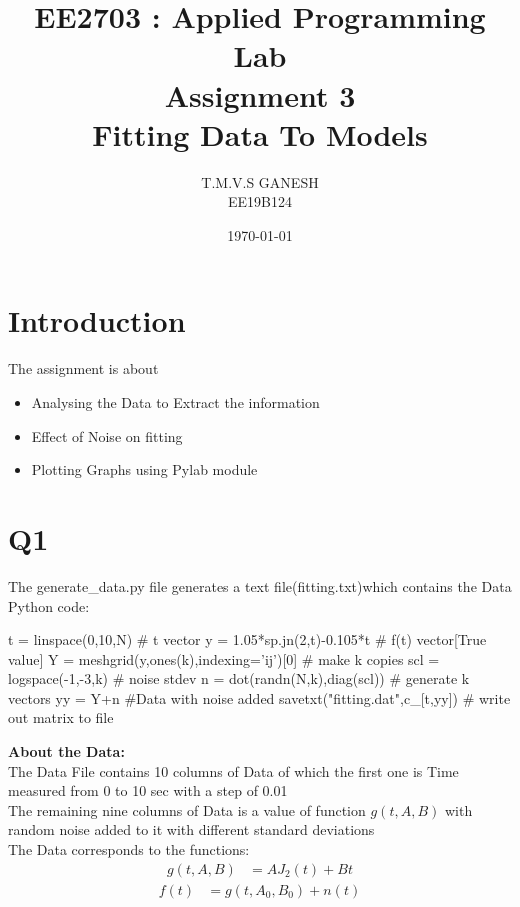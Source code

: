\documentclass[12pt, a4paper]{report}
\title{\textbf{EE2703 : Applied Programming Lab \\ Assignment 3\\Fitting Data To Models}}
\author{T.M.V.S GANESH \\ EE19B124} %
\date{\today} %
\begin{document}
		
		
\maketitle %
\section*{Introduction}
 The assignment is about 
 \begin{itemize}
  	\item Analysing the Data to Extract the information
  	\item Effect of Noise on fitting
  	\item Plotting Graphs using Pylab module 
  \end{itemize}
\section*{Q1}  
  
The generate\_data.py file generates a text file(fitting.txt)which contains the Data  \\

Python code:
\begin{py_code}
    t = linspace(0,10,N)                      # t vector
    y = 1.05*sp.jn(2,t)-0.105*t               # f(t) vector[True value]
    Y = meshgrid(y,ones(k),indexing='ij')[0]  # make k copies
    scl = logspace(-1,-3,k)                     # noise stdev
    n = dot(randn(N,k),diag(scl))               # generate k vectors
    yy = Y+n                                     #Data with noise added
    savetxt("fitting.dat",c_[t,yy])         # write out matrix to file
\end{py_code}
  \textbf{About the Data:} \\
The Data File contains 10 columns of Data of which the first one is Time measured from 0
to 10 sec with a step of 0.01\\
The remaining nine columns of Data is a value of function $g(t,A,B)$ with random noise added to it with different standard deviations \\

The Data corresponds to the functions: 
\begin{align}
    g(t,A,B) &= AJ_2(t) + Bt
\end{align}
\begin{align}
    f(t) &= g(t,A_0,B_0) + n(t)
\end{align}
\end{document}

